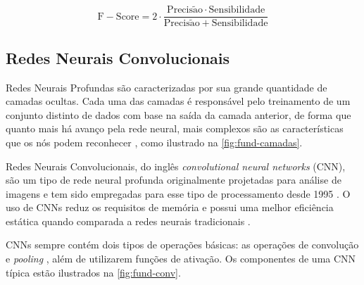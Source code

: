 \begin{equation} \label{eq:fund-fscore}
\mathrm{
  F-Score = 2 \cdot \frac{Precis\tilde{a}o \cdot Sensibilidade}{Precis\tilde{a}o + Sensibilidade}
}
\end{equation}




\subsection{Redes Neurais Convolucionais} \label{cap:fund-ia-rn-conv}
Redes Neurais Profundas são caracterizadas por sua grande quantidade de camadas ocultas. Cada uma das camadas é responsável pelo treinamento de um conjunto distinto de dados com base na saída da camada anterior, de forma que quanto mais há avanço pela rede neural, mais complexos são as características que os nós podem reconhecer \cite{ref:Nicholson}, como ilustrado na \autoref{fig:fund-camadas}.

Redes Neurais Convolucionais, do inglês \textit{convolutional neural networks} (CNN), são um tipo de rede neural profunda originalmente projetadas para análise de imagens \cite{ref:Eden-Ierapetritou-Towler} e tem sido empregadas para esse tipo de processamento desde 1995 \cite{ref:Yan}. O uso de CNNs reduz os requisitos de memória e possui uma melhor eficiência estática quando comparada a redes neurais tradicionais \cite{ref:Goodfellow-Bengio-Courville}.

CNNs sempre contém dois tipos de operações básicas: as operações de convolução e \textit{pooling} \cite{ref:Eden-Ierapetritou-Towler}, além de utilizarem funções de ativação. Os componentes de uma CNN típica estão ilustrados na \autoref{fig:fund-conv}.

